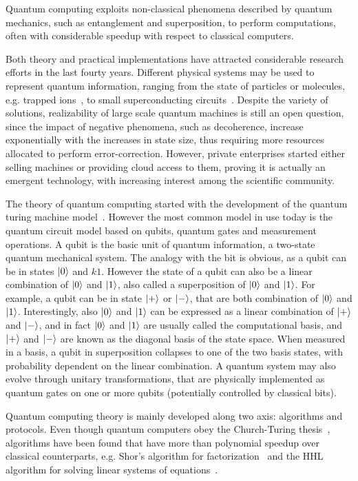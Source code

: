 Quantum computing exploits non-classical phenomena described by quantum
mechanics, such as entanglement and superposition, to perform computations,
 often with considerable speedup with respect to classical computers.

Both theory and practical implementations have attracted considerable research
efforts in the last fourty years. Different physical systems may be used to represent
quantum information, ranging from the state of
particles or molecules, e.g. trapped ions~\cite{pogorelov_compact_2021}, to
small superconducting circuits~\cite{clarke_superconducting_2008}. Despite the
variety of solutions, realizability of large scale quantum machines is still an
open question, since the impact of negative phenomena, such as decoherence,
increase exponentially with the increases in state size, thus requiring more resources allocated to
perform error-correction. However, private enterprises started
either selling machines or providing cloud access to them, proving it is actually 
an emergent technology, with increasing interest among the scientific community.

The theory of quantum computing started with the development of the quantum
turing machine model~\cite{benioff_quantum_1982}. However the most common model
in use today is the quantum circuit model based on qubits, quantum gates and
measurement operations. A qubit is the basic unit of quantum information, a
two-state quantum mechanical system. The analogy with the bit is obvious, as a qubit can be in states $\ket{0}$ and $k1$. However the state of a qubit can also be a linear combination of $\ket{0}$ and $\ket{1}$, also called a superposition of $\ket{0}$ and $\ket{1}$. For example, a qubit can be in state $\ket{+}$ or $\ket{-}$, that are both combination of $\ket{0}$ and $\ket{1}$. Interestingly, also $\ket{0}$ and $\ket{1}$ can be expressed as a linear combination of $\ket{+}$ and $\ket{-}$, and in fact  $\ket{0}$ and $\ket{1}$ are usually called the computational basis, and $\ket{+}$ and $\ket{-}$ are known as the diagonal basis of the state space. When measured in a basis, a qubit 
in superposition collapses to one of the two basis states,
with probability dependent on the linear combination. A quantum system may also evolve through unitary transformations, that are physically implemented as quantum gates on one or more qubits (potentially controlled by classical bits).

Quantum computing theory is mainly developed along two axis: algorithms and
protocols. Even though quantum computers obey the Church-Turing
thesis~\cite{nielsen_quantum_2010}, algorithms have been found that have more
than polynomial speedup over classical counterparts, e.g. Shor's algorithm for
factorization~\cite{shor_algorithms_1994} and the HHL algorithm for solving
linear systems of equations~\cite{harrow_quantum_2009}.

